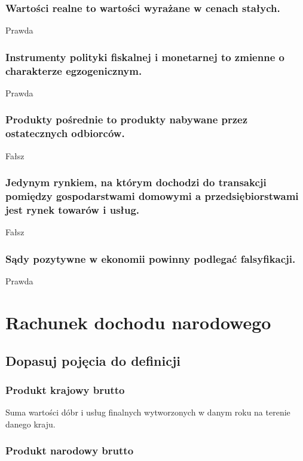 \documentclass[a4paper,12pt]{article}
\begin{document}
\subsubsection{Wartości realne to wartości wyrażane w cenach stałych.}

Prawda

\subsubsection{Instrumenty polityki fiskalnej i monetarnej to zmienne o charakterze egzogenicznym.}

Prawda

\subsubsection{Produkty pośrednie to produkty nabywane przez ostatecznych odbiorców.}

Fałsz

\subsubsection{Jedynym rynkiem, na którym dochodzi do transakcji pomiędzy gospodarstwami domowymi a przedsiębiorstwami jest rynek towarów i usług.}

Fałsz

\subsubsection{Sądy pozytywne w ekonomii powinny podlegać falsyfikacji.}

Prawda

\section{Rachunek dochodu narodowego}

\subsection{Dopasuj pojęcia do definicji}

\subsubsection*{Produkt krajowy brutto}
Suma wartości dóbr i usług finalnych wytworzonych w danym roku na terenie danego kraju.

\subsubsection*{Produkt narodowy brutto}
\end{document}
